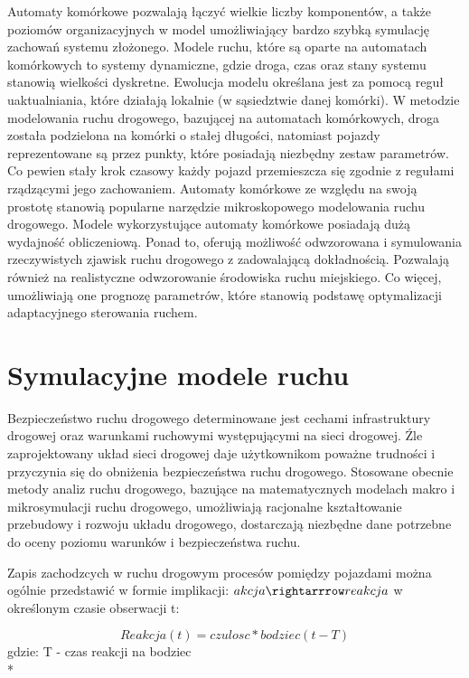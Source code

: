 \documentclass{sprawozdanie-agh}
\begin{document}
	Automaty komórkowe pozwalają łączyć wielkie liczby komponentów, a także poziomów organizacyjnych w model umożliwiający bardzo szybką symulację zachowań systemu złożonego. Modele ruchu, które są oparte na automatach komórkowych to systemy dynamiczne, gdzie droga, czas oraz stany systemu stanowią wielkości dyskretne. Ewolucja modelu określana jest za pomocą reguł uaktualniania, które działają lokalnie (w sąsiedztwie danej komórki). W metodzie modelowania ruchu drogowego, bazującej na automatach komórkowych, droga została podzielona na komórki o stałej długości, natomiast pojazdy reprezentowane są przez punkty, które posiadają niezbędny zestaw parametrów. Co pewien stały krok czasowy każdy pojazd przemieszcza się zgodnie z regułami rządzącymi jego zachowaniem. Automaty komórkowe ze względu na swoją prostotę stanowią popularne narzędzie mikroskopowego modelowania ruchu drogowego. Modele wykorzystujące automaty komórkowe posiadają dużą wydajność obliczeniową. Ponad to, oferują możliwość odwzorowana i symulowania rzeczywistych zjawisk ruchu drogowego z zadowalającą dokładnością. Pozwalają również na realistyczne odwzorowanie środowiska ruchu miejskiego. Co więcej, umożliwiają one prognozę parametrów, które stanowią podstawę optymalizacji adaptacyjnego sterowania ruchem.


	\section{Symulacyjne modele ruchu}

	Bezpieczeństwo ruchu drogowego determinowane jest cechami infrastruktury drogowej oraz warunkami ruchowymi występującymi na sieci drogowej. Źle zaprojektowany układ sieci drogowej daje użytkownikom poważne trudności i przyczynia się do obniżenia bezpieczeństwa ruchu drogowego. Stosowane obecnie metody analiz ruchu drogowego, bazujące na matematycznych modelach makro i mikrosymulacji ruchu drogowego, umożliwiają racjonalne kształtowanie przebudowy i rozwoju układu drogowego, dostarczają niezbędne dane potrzebne do oceny poziomu warunków i bezpieczeństwa ruchu.

	Zapis zachodzcych w ruchu drogowym procesów pomiędzy pojazdami można ogólnie przedstawić w formie implikacji: $akcja \rightarrrow reakcja$ w określonym czasie obserwacji t:

	\begin{equation}
		Reakcja(t)=czulosc*bodziec(t-T)
	\end{equation}
	gdzie: T - czas reakcji na bodziec \\*
\end{document}
